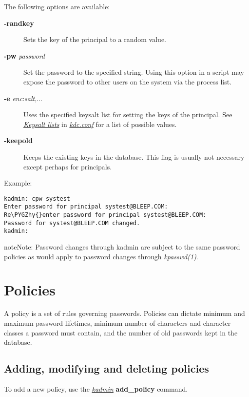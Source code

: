 \documentclass[letterpaper,10pt,english]{sphinxmanual}
\def\PYGZhy{\char`\-}
\begin{document}
The following options are available:
\begin{description}
\item[{\textbf{-randkey}}] \leavevmode
Sets the key of the principal to a random value.

\item[{\textbf{-pw} \emph{password}}] \leavevmode
Set the password to the specified string.  Using this option in a
script may expose the password to other users on the system via
the process list.

\item[{\textbf{-e} \emph{enc}:\emph{salt},...}] \leavevmode
Uses the specified keysalt list for setting the keys of the
principal.  See {\hyperref[admin/conf_files/kdc_conf:keysalt-lists]{\emph{Keysalt lists}}} in {\hyperref[admin/conf_files/kdc_conf:kdc-conf-5]{\emph{kdc.conf}}} for a
list of possible values.

\item[{\textbf{-keepold}}] \leavevmode
Keeps the existing keys in the database.  This flag is usually not
necessary except perhaps for  principals.

\end{description}

Example:

\begin{Verbatim}[commandchars=\\\{\}]
kadmin: cpw systest
Enter password for principal systest@BLEEP.COM:
Re\PYGZhy{}enter password for principal systest@BLEEP.COM:
Password for systest@BLEEP.COM changed.
kadmin:
\end{Verbatim}

\begin{notice}{note}{Note:}
Password changes through kadmin are subject to the same
password policies as would apply to password changes through
\emph{kpasswd(1)}.
\end{notice}


\section{Policies}
\label{admin/database:policies}\label{admin/database:id1}
A policy is a set of rules governing passwords.  Policies can dictate
minimum and maximum password lifetimes, minimum number of characters
and character classes a password must contain, and the number of old
passwords kept in the database.


\subsection{Adding, modifying and deleting policies}
\label{admin/database:adding-modifying-and-deleting-policies}
To add a new policy, use the {\hyperref[admin/admin_commands/kadmin_local:kadmin-1]{\emph{kadmin}}} \textbf{add\_policy} command.
\end{document}
